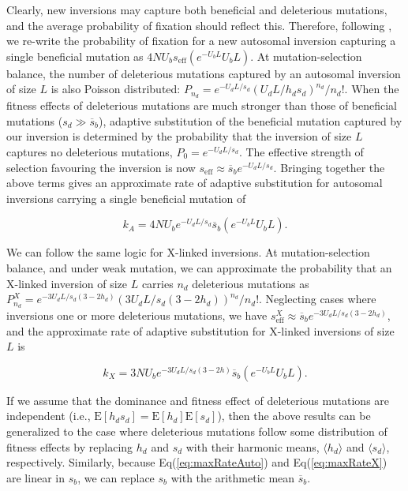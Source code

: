 \documentclass[11pt]{article}
\begin{document}
Clearly, new inversions may capture both beneficial and deleterious mutations, and the average probability of fixation should reflect this. Therefore, following \citep{OrrKim1998, Orr2000}, we re-write the probability of fixation for a new autosomal inversion capturing a single beneficial mutation as $4N U_b s_{\text{eff}} (e^{-U_b L} U_b L)$. At mutation-selection balance, the number of deleterious mutations captured by an autosomal inversion of size $L$ is also Poisson distributed: $P_{n_d} = e^{-U_d L/s_d}(U_d L/h_d s_d)^{n_d}/n_d!$. When the fitness effects of deleterious mutations are much stronger than those of beneficial mutations ($s_d \gg \overline{s}_b$), adaptive substitution of the beneficial mutation captured by our inversion is determined by the probability that the inversion of size $L$ captures no deleterious mutations, $P_0 = e^{-U_d L/s_d}$. The effective strength of selection favouring the inversion is now $s_{\text{eff}} \approx \overline{s}_b e^{-U_d L/s_d}$. Bringing together the above terms gives an approximate rate of adaptive substitution for autosomal inversions carrying a single beneficial mutation of

\begin{equation} \label{eq:maxRateAuto}
	k_A = 4N U_b e^{-U_d L/s_d} \overline{s}_b (e^{-U_b L} U_b L).
\end{equation}

\noindent We can follow the same logic for X-linked inversions. At mutation-selection balance, and under weak mutation, we can approximate the probability that an X-linked inversion of size $L$ carries $n_d$ deleterious mutations as $P^X_{n_d} = e^{- 3 U_d L/s_d(3 - 2 h_d)}(3 U_d L/s_d(3 - 2 h_d))^{n_d}/n_d!$. Neglecting cases where inversions one or more deleterious mutations, we have $s^X_{\text{eff}} \approx \overline{s}_b e^{- 3 U_d L/s_d(3 - 2 h_d)}$, and the approximate rate of adaptive substitution for X-linked inversions of size $L$ is

\begin{equation} \label{eq:maxRateX}
	k_X = 3 N U_b e^{- 3 U_d L/s_d(3 - 2 h)} \overline{s}_b (e^{-U_b L} U_b L).
\end{equation}

\noindent If we assume that the dominance and fitness effect of deleterious mutations are independent (i.e., $\text{E}[h_d s_d] = \text{E}[h_d]\text{E}[s_d]$), then the above results can be generalized to the case where deleterious mutations follow some distribution of fitness effects by replacing $h_d$ and $s_d$ with their harmonic means, $\langle h_d \rangle$ and $\langle s_d \rangle$, respectively. Similarly, because Eq(\ref{eq:maxRateAuto}) and Eq(\ref{eq:maxRateX}) are linear in $s_b$, we can replace $s_b$ with the arithmetic mean $\overline{s}_b$.
\end{document}
